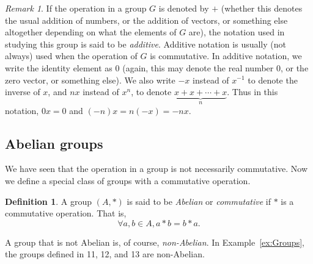 \documentclass[svgnames]{article}
\theoremstyle{definition}
\newtheorem{Definition}[Theorem]{Definition}
\theoremstyle{remark}
\newtheorem*{Remark*}{Remark}
\begin{document}
\begin{Remark*}
If the operation in a group $G$ is denoted by $+$ (whether this denotes the usual addition of numbers, or the addition of vectors, or something else altogether depending on what the elements of $G$ are), the notation used in studying this group is said to be \emph{additive}. Additive notation is usually (not always) used when the operation of $G$ is commutative. In additive notation, we write the identity element as $0$ (again, this may denote the real number $0$, or the zero vector, or something else). We also write $-x$ instead of $x^{-1}$ to denote the inverse of $x$, and $nx$ instead of $x^n$, to denote $\underbrace{x + x + \cdots + x}_n$. Thus in this notation, $0x = 0$ and $(-n)x = n(-x) = -nx$.
\end{Remark*}

\subsection{Abelian groups}\label{subsec:AbGrps}
We have seen that the operation in a group is not necessarily commutative. Now we define a special class of groups with a commutative operation.
\begin{Definition}
A group $(A, *)$ is said to be \emph{Abelian} or \emph{commutative} if $*$ is a commutative operation. That is,
\begin{equation*}
\forall a, b \in A, a*b = b*a.
\end{equation*}
\end{Definition}
A group that is not Abelian is, of course, \emph{non-Abelian}. In Example~\ref{ex:Groups}, the groups defined in 11, 12, and 13 are non-Abelian.
\end{document}
